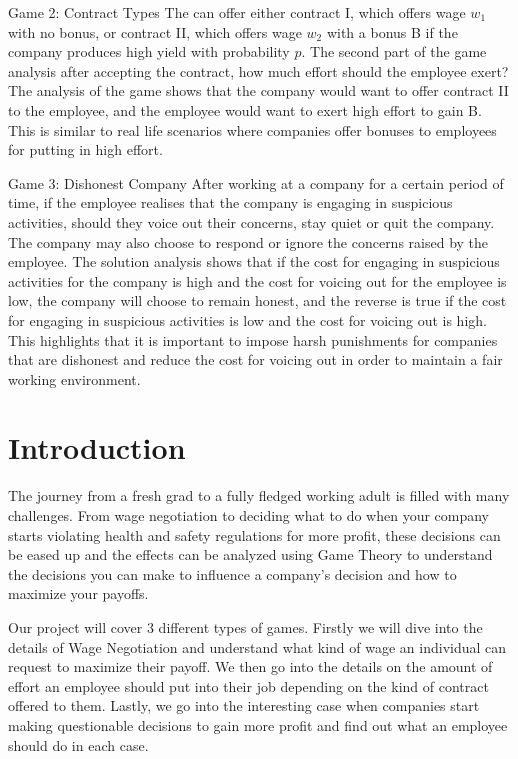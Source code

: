 \documentclass[a4paper, 12pt]{article}
\begin{document}
Game 2: Contract Types
\newline
The can offer either contract I, which offers wage $w_1$ with no bonus, or contract II, which offers wage $w_2$ with a bonus B if the company produces high yield with probability  $p$. The second part of the game analysis after accepting the contract, how much effort should the employee exert? The analysis of the game shows that the company would want to offer contract II to the employee, and the employee would want to exert high effort to gain B. This is similar to real life scenarios where companies offer bonuses to employees for putting in high effort. 

Game 3: Dishonest Company
\newline
After working at a company for a certain period of time, if the employee realises that the company is engaging in suspicious activities, should they voice out their concerns, stay quiet or quit the company. The company may also choose to respond or ignore the concerns raised by the employee. The solution analysis shows that if the cost for engaging in suspicious activities for the company is high and the cost for voicing out for the employee is low, the company will choose to remain honest, and the reverse is true if the cost for engaging in suspicious activities is low and the cost for voicing out is high. This highlights that it is important to impose harsh punishments for companies that are dishonest and reduce the cost for voicing out in order to maintain a fair working environment.

\newpage

\tableofcontents


\newpage
{}

\section{Introduction}

The journey from a fresh grad to a fully fledged working adult is filled with many challenges. From wage negotiation to deciding what to do when your company starts violating health and safety regulations for more profit, these decisions can be eased up and the effects can be analyzed using Game Theory to understand the decisions you can make to influence a company's decision and how to maximize your payoffs.

Our project will cover 3 different types of games. Firstly we will dive into the details of Wage Negotiation and understand what kind of wage an individual can request to maximize their payoff. We then go into the details on the amount of effort an employee should put into their job depending on the kind of contract offered to them. Lastly, we go into the interesting case when companies start making questionable decisions to gain more profit and find out what an employee should do in each case.
\end{document}

